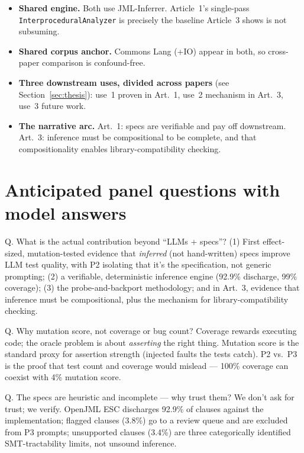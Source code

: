\documentclass[11pt]{article}
\begin{document}
\begin{itemize}[leftmargin=1.4em,itemsep=0.15em]
  \item \textbf{Shared engine.} Both use JML-Inferrer. Article~1's single-pass
        \texttt{InterproceduralAnalyzer} is precisely the baseline Article~3
        shows is not subsuming.
  \item \textbf{Shared corpus anchor.} Commons Lang (+IO) appear in both, so
        cross-paper comparison is confound-free.
  \item \textbf{Three downstream uses, divided across papers} (see
        Section~\ref{sec:thesis}): use~1 proven in Art.~1, use~2 mechanism in
        Art.~3, use~3 future work.
  \item \textbf{The narrative arc.} Art.~1: specs are verifiable and pay off
        downstream. Art.~3: inference must be compositional to be complete, and
        that compositionality enables library-compatibility checking.
\end{itemize}

\section{Anticipated panel questions with model answers}
\label{sec:qa}

\begin{qbox}{Q. What is the actual contribution beyond ``LLMs + specs''?}
(1) First effect-sized, mutation-tested evidence that \emph{inferred} (not
hand-written) specs improve LLM test quality, with P2 isolating that it's the
specification, not generic prompting; (2) a verifiable, deterministic inference
engine (92.9\% discharge, 99\% coverage); (3) the probe-and-backport
methodology; and in Art.~3, evidence that inference must be compositional, plus
the mechanism for library-compatibility checking.
\end{qbox}

\begin{qbox}{Q. Why mutation score, not coverage or bug count?}
Coverage rewards executing code; the oracle problem is about \emph{asserting}
the right thing. Mutation score is the standard proxy for assertion strength
(injected faults the tests catch). P2 vs.\ P3 is the proof that test count and
coverage would mislead --- 100\% coverage can coexist with 4\% mutation score.
\end{qbox}

\begin{qbox}{Q. The specs are heuristic and incomplete --- why trust them?}
We don't ask for trust; we verify. OpenJML ESC discharges 92.9\% of clauses
against the implementation; flagged clauses (3.8\%) go to a review queue and
are excluded from P3 prompts; unsupported clauses (3.4\%) are three
categorically identified SMT-tractability limits, not unsound inference.
\end{qbox}
\end{document}
